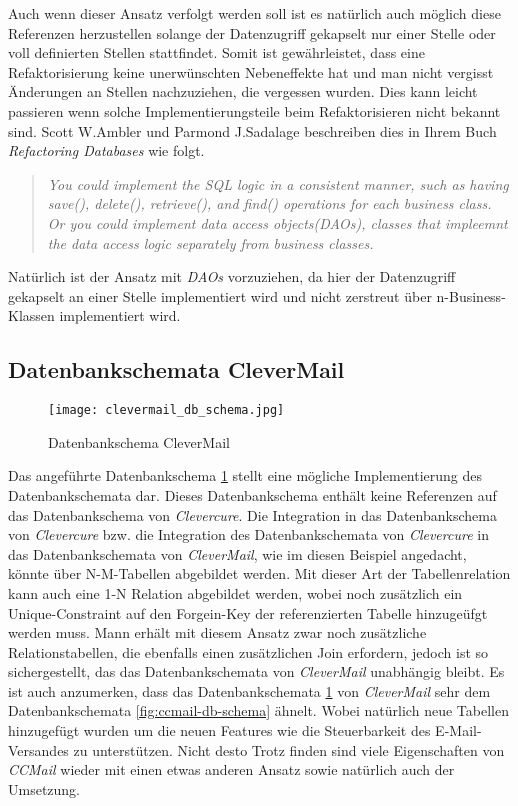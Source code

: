 \newline
\newline
Auch wenn dieser Ansatz verfolgt werden soll ist es natürlich auch möglich diese Referenzen herzustellen solange der Datenzugriff gekapselt nur einer Stelle oder voll definierten Stellen stattfindet. Somit ist gewährleistet, dass eine Refaktorisierung keine unerwünschten Nebeneffekte hat und man nicht vergisst Änderungen an Stellen nachzuziehen, die vergessen wurden. Dies kann leicht passieren wenn solche Implementierungsteile beim Refaktorisieren nicht bekannt sind. Scott W.Ambler und Parmond J.Sadalage beschreiben dies in Ihrem Buch 
\emph{Refactoring Databases} \cite[66]{refactoreDatabase} wie folgt.
\begin{quote}
\emph{You could implement the SQL logic in a consistent manner, such as having save(), delete(), retrieve(), and find() operations for each business class. Or you could implement data access objects(DAOs), classes that impleemnt the data access logic separately from business classes.}
\end{quote}
Natürlich ist der Ansatz mit \emph{DAOs} vorzuziehen, da hier der Datenzugriff gekapselt an einer Stelle implementiert wird und nicht zerstreut über n-Business-Klassen implementiert wird.
\newpage
\subsection{Datenbankschemata CleverMail}
\begin{figure}[h]
\centering
\texttt{[image: clevermail\_db\_schema.jpg]}
\caption{Datenbankschema CleverMail}
\label{fig:clevermail-db-schema}
\end{figure}
Das angeführte Datenbankschema \ref{fig:clevermail-db-schema} stellt eine mögliche Implementierung des Datenbankschemata dar. Dieses Datenbankschema enthält keine Referenzen auf das Datenbankschema von \emph{Clevercure}. Die Integration in das Datenbankschema von \emph{Clevercure} bzw. die Integration des Datenbankschemata von \emph{Clevercure} in das Datenbankschemata von \emph{CleverMail}, wie im diesen Beispiel angedacht, könnte über N-M-Tabellen abgebildet werden. Mit dieser Art der Tabellenrelation kann auch eine 1-N Relation abgebildet werden, wobei noch zusätzlich ein Unique-Constraint auf den Forgein-Key der referenzierten Tabelle hinzugeüfgt werden muss. Mann erhält mit diesem Ansatz zwar noch zusätzliche Relationstabellen, die ebenfalls einen zusätzlichen Join erfordern, jedoch ist so sichergestellt, das das Datenbankschemata von \emph{CleverMail} unabhängig bleibt.
\newline
\newline
Es ist auch anzumerken, dass das Datenbankschemata \ref{fig:clevermail-db-schema} von \emph{CleverMail} sehr dem Datenbankschemata \ref{fig:ccmail-db-schema} ähnelt. Wobei natürlich neue Tabellen hinzugefügt wurden um die neuen Features wie die Steuerbarkeit des E-Mail-Versandes zu unterstützen. Nicht desto Trotz finden sind viele Eigenschaften von \emph{CCMail} wieder mit einen etwas anderen Ansatz sowie natürlich auch der Umsetzung.